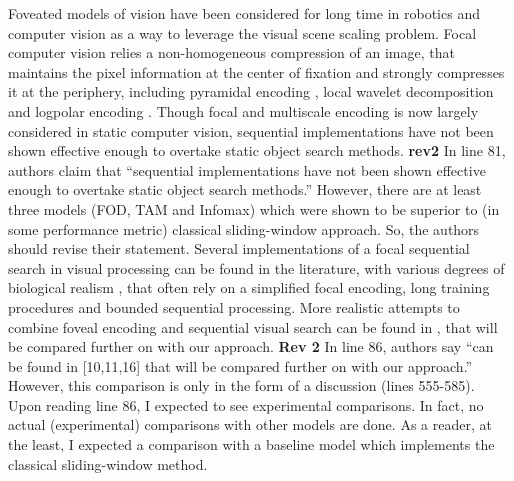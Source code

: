 Foveated models of vision have been considered for long time in robotics and computer vision as a way to leverage the visual scene scaling problem. Focal computer vision relies a non-homogeneous compression of an image, that maintains the pixel information at the center of fixation and strongly compresses it at the periphery, including pyramidal encoding \cite{kortum1996implementation,Butko2010infomax}, local wavelet decomposition \cite{dauce2018active} and logpolar encoding \cite{fischer2007self,Traver10}. Though focal and multiscale encoding is now largely considered in static computer vision, sequential implementations have not been shown effective enough to overtake static object search methods.
{\color{red} \textbf{rev2} In line 81, authors claim that “sequential implementations have not been shown effective enough to overtake static object search methods.” However, there are at least three models (FOD, TAM and Infomax) which were shown to be superior to (in some performance metric) classical sliding-window approach. So, the authors should revise their statement.
}
Several implementations of a focal sequential search in visual processing can be found in the literature, with various degrees of biological realism \cite{mnih2014recurrent,fu2017look}, that often rely on a simplified focal encoding, long training procedures and bounded sequential processing. More realistic attempts to combine foveal encoding and sequential visual search can be {\color{red} found in \cite{Butko2010infomax,denil2012learning,dauce2018active}}, that will be compared further on with our approach.
{\color{red} \textbf{Rev 2}
In line 86, authors say “can be found in [10,11,16] that will be compared further on with our approach.” However, this comparison is only in the form of a discussion (lines 555-585). Upon reading line 86, I expected to see experimental comparisons. In fact, no actual (experimental) comparisons with other models are done. As a reader, at the least, I expected a comparison with a baseline model which implements the classical sliding-window method.
}


